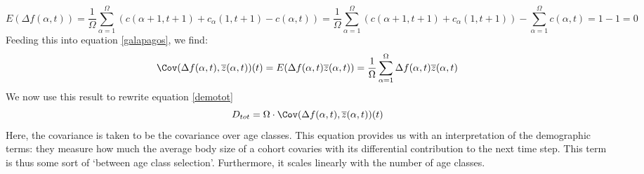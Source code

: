 \begin{equation}
E(\Delta f(\alpha,t)) = \frac{1}{\Omega} \sum_{\alpha=1}^\Omega (c(\alpha+1,t+1) + c_\alpha(1,t+1) - c(\alpha,t)) = \frac{1}{\Omega} \sum_{\alpha=1}^\Omega (c(\alpha+1,t+1) + c_\alpha(1,t+1)) - \sum_{\alpha=1}^\Omega c(\alpha,t) = 1 - 1 = 0
\end{equation}
Feeding this into equation \ref{galapagos}, we find:
\begin{equation}
\Cov(\Delta f(\alpha,t),\overline{z}(\alpha,t))(t) = E(\Delta f(\alpha,t) \overline{z}(\alpha,t)) = \frac{1}{\Omega} \sum_{\alpha=1}^\Omega \Delta f(\alpha,t) \overline{z}(\alpha,t)
\end{equation}
We now use this result to rewrite equation \ref{demotot}
\begin{equation} \label{app:ape:eq:dtot}
D_{tot} = \Omega \cdot \Cov(\Delta f(\alpha,t),\overline{z}(\alpha,t))(t)
\end{equation}
Here, the covariance is taken to be the covariance over age classes. This equation provides us with an interpretation of the demographic terms: they measure how much the average body size of a cohort covaries with its differential contribution to the next time step. This term is thus some sort of `between age class selection'. Furthermore, it scales linearly with the number of age classes.

